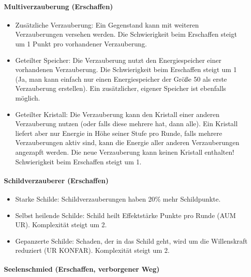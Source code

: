 \documentclass{article}
\begin{document}
\paragraph{Multiverzauberung (Erschaffen)}

\begin{itemize}
\item Zusätzliche Verzauberung: Ein Gegenstand kann mit weiteren Verzauberungen versehen werden. Die Schwierigkeit beim Erschaffen steigt um 1 Punkt pro vorhandener Verzauberung.
\item Geteilter Speicher: Die Verzauberung nutzt den Energiespeicher einer vorhandenen Verzauberung. Die Schwierigkeit beim Erschaffen steigt um 1 (Ja, man kann einfach nur einen Energiespeicher der Größe 50 als erste Verzauberung erstellen). Ein zusätzlicher, eigener Speicher ist ebenfalls möglich.
\item Geteilter Kristall: Die Verzauberung kann den Kristall einer anderen Verzauberung nutzen (oder falls diese mehrere hat, dann alle). Ein Kristall liefert aber nur Energie in Höhe seiner Stufe pro Runde, falls mehrere Verzauberungen aktiv sind, kann die Energie aller anderen Verzauberungen angezapft werden. Die neue Verzauberung kann keinen Kristall enthalten! Schwierigkeit beim Erschaffen steigt um 1.
\end{itemize}

\paragraph{Schildverzauberer (Erschaffen)}

\begin{itemize}
\item Starke Schilde: Schildverzauberungen haben 20\% mehr Schildpunkte.
\item Selbst heilende Schilde: Schild heilt Effektstärke Punkte pro Runde (AUM UR). Komplexität steigt um 2.
\item Gepanzerte Schilde: Schaden, der in das Schild geht, wird um die Willenskraft reduziert (UR KONFAR). Komplexität steigt um 2.
\end{itemize}

\paragraph{Seelenschmied (Erschaffen, verborgener Weg)}
\end{document}
